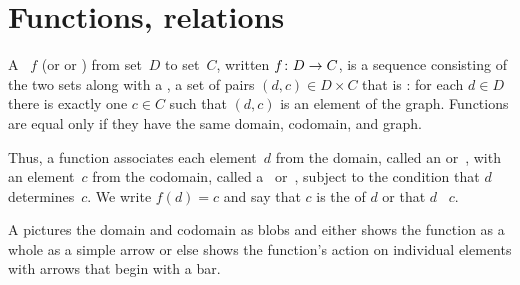 \documentclass{ibl}  %
\begin{document}
\begin{problem}[\maxlength]
\end{problem}











\chapter{Functions, relations}
\begin{df}
A ~$f$ (or  or ) 
from  set~$D$
to  set~$C$, written $\mbox{$f\colon D\to C$}$,
is a sequence consisting of the two sets along with a , 
a set of pairs $(d,c)\in D\times C$ that is 
: for each $d\in D$ there is
exactly one $c\in C$ such that $(d,c)$ is an element of the graph. 
Functions are equal only if they have the same domain, codomain,
and graph.
\end{df}

\noindent Thus, a function associates each element~$d$ from the domain,
called an  or~,
with an element~$c$ from the codomain, 
called a~ or~,
subject to the condition that $d$ determines~$c$. 
We write $f(d)=c$ and say that $c$ is the  of $d$ 
or that $d$ ~$c$.

A  pictures the domain and 
codomain as blobs and 
either shows the function as a whole as a simple arrow   
or else shows the function's action on individual elements 
with arrows that begin with a bar.
\begin{center}
  \hspace{8em}
\end{center}
\end{document}
